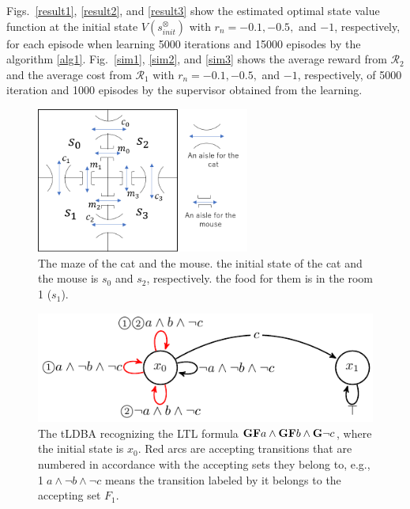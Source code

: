 \documentclass[10 pt, dvipdfmx]{article}
\theoremstyle{definition}
\begin{document}
Figs.\ \ref{result1}, \ref{result2}, and \ref{result3} show the estimated optimal state value function at the initial state $V(s^{\otimes}_{init})$ with $r_{n} = -0.1, -0.5,$ and $-1$, respectively, for each episode when learning 5000 iterations and 15000 episodes by the algorithm \ref{alg1}.
Fig.\ \ref{sim1}, \ref{sim2}, and \ref{sim3} shows the average reward from $\mathcal{R}_2$ and the average cost from $\mathcal{R}_1$ with $r_{n} = -0.1, -0.5,$ and $-1$, respectively, of 5000 iteration and 1000 episodes by the supervisor obtained from the learning.

\begin{figure}[htbp]
   \centering
   \vspace{2mm}
   \includegraphics[width=7cm]{cat_mouse.png}
   \caption{The maze of the cat and the mouse. the initial state of the cat and the mouse is $s_0$ and $s_2$, respectively. the food for them is in the room 1 ($s_1$).}
   \label{cat_mouse}
\end{figure}

\begin{figure}[htbp]
   \centering
   \vspace{2mm}
   \includegraphics[bb=0 0 247 80,scale=0.85]{ldgba_original.pdf}
   \caption{The tLDBA recognizing the LTL formula $\text{{\bf GF}}a \wedge \text{{\bf GF}}b \wedge \text{{\bf G}}\neg c$, where the initial state is $x_0$. Red arcs are accepting transitions that are numbered in accordance with the accepting sets they belong to, e.g., \textcircled{\scriptsize 1}$a \land \neg b \land \neg c$ means the transition labeled by it belongs to the accepting set $F_1$.}
   \label{tldba}
\end{figure}
\end{document}
